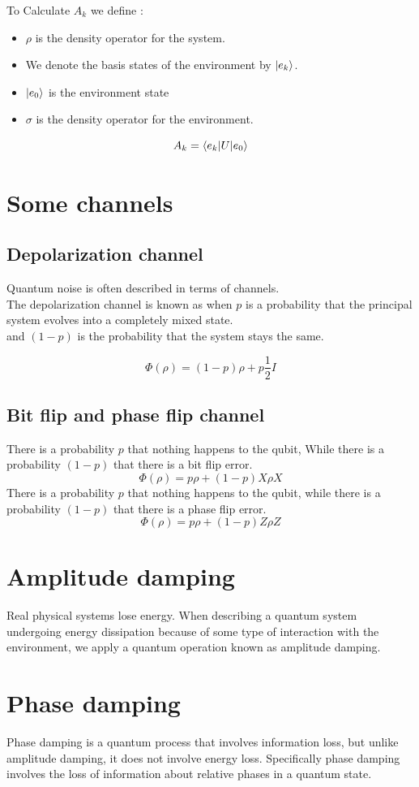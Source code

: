 \documentclass[12pt,oneside]{book}
\begin{document}
    To Calculate $A_k$ we define :
    \begin{itemize}
        \item $\rho$ is the density operator for the system.
        \item We denote the basis states of the environment by $\ket{e_k}$.
        \item $\ket{e_0}$ is the environment state
        \item $\sigma$ is the density operator for the environment.
    \end{itemize}
    \[ A_k = \braket{e_k|U|e_0} \]
\section{Some channels}
\subsection{Depolarization channel}
    Quantum noise is often described in terms of channels.\\
    The depolarization channel is known as when $p$  is a probability that the principal system evolves into a completely mixed state.\\
    and $(1-p)$ is the probability that the system stays the same.

    \[ \Phi(\rho) = (1-p)\rho + p\frac{1}{2}I \]
\subsection{Bit flip and phase flip channel}
    There is a probability $p$ that nothing happens to the qubit, While there is a probability $(1-p)$ that there is a bit flip error.
    \[ \Phi(\rho) = p\rho+(1-p)X\rho X \]
    There is a probability $p$ that nothing happens to the qubit, while there is a probability $(1-p)$ that there is a phase flip error.
    \[ \Phi(\rho) = p\rho + (1-p)Z\rho Z \]
\section{Amplitude damping}	
Real physical systems lose energy. When describing a quantum system undergoing energy dissipation because of some type of interaction with the environment, we apply a quantum operation known as amplitude damping.
\section{Phase damping}
Phase damping is a quantum process that involves information loss, but unlike amplitude damping, it does not involve energy loss. Specifically phase damping involves the loss of information about relative phases in a quantum state.
\end{document}
